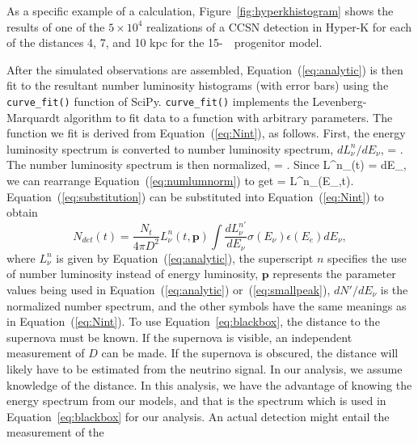 As a specific example of a calculation, 
Figure~\ref{fig:hyperkhistogram} shows the results of one of the $5\times10^4$
realizations of a CCSN detection in Hyper-K for each of the distances 4, 7, and
10 kpc for the 15-\Msol\ \ls\ progenitor model. 


After the simulated observations are assembled, 
Equation~(\ref{eq:analytic}) is
then fit to the resultant number luminosity histograms (with error bars)
using the \texttt{curve\_fit()} function
of SciPy.  
\texttt{curve\_fit()} implements
the Levenberg-Marquardt algorithm to fit data to a function with arbitrary
parameters.  The function we fit is derived from 
Equation~(\ref{eq:Nint}), as follows.  First, the energy luminosity spectrum is
converted to number luminosity spectrum, $dL^{n}_{\nu}/dE_\nu$,
\beq
{} = .
\eeq
The number luminosity spectrum is then normalized,
\beq
\label{eq:numlumnorm}
 = .
\eeq
Since
\beq
L^n_\nu(t) = \int {} dE_\nu,
\eeq
we can rearrange Equation~(\ref{eq:numlumnorm}) to get
\beq
\label{eq:substitution}
 = L^n_\nu(E_\nu,t).
\eeq
 Equation~(\ref{eq:substitution}) can be substituted into 
Equation~(\ref{eq:Nint}) to obtain
\begin{equation}
\label{eq:blackbox}
N_{det}(t) =  \frac{N_{t}}{4\pi D^2}
L^n_\nu(t,\boldsymbol{p})
\int 
\frac{dL^{n \prime}_{\nu}}{dE_{\nu}}\sigma(E_\nu)\epsilon(E_e)dE_\nu,
\end{equation}
where $L^n_\nu$ is given by
Equation~(\ref{eq:analytic}), the superscript $n$
specifies the use of number luminosity instead of energy luminosity, 
$\boldsymbol{p}$ represents the parameter values being used in 
Equation~(\ref{eq:analytic}) or~(\ref{eq:smallpeak}), $dN'/dE_\nu$ is the
normalized number spectrum, and the other symbols have the same
meanings as in Equation~(\ref{eq:Nint}). To use
Equation~\ref{eq:blackbox}, the distance to the supernova must be
known.  If the supernova is visible, an independent measurement of $D$
can be made.  If the supernova is obscured, the distance will likely
have to be estimated from the neutrino signal.  In our analysis, we
assume knowledge of the distance. In this analysis, we have the
advantage of knowing the energy spectrum from our models, and that is
the spectrum which is used in Equation~\ref{eq:blackbox} for our
analysis.  An actual detection might entail the measurement of the

